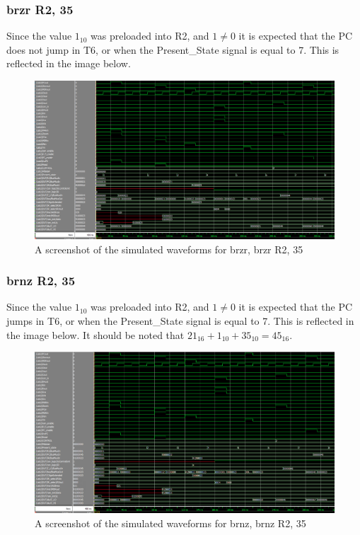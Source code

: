\documentclass{article}
\begin{document}
        \subsubsection{brzr R2, 35}
            Since the value $1_{10}$ was preloaded into R2, and $1 \neq 0$ it is expected that the PC does not jump in T6, or when the Present\_State signal is equal to 7. This is reflected in the image below.

                \begin{figure}[h!]
                    \begin{center}
                        \includegraphics[width=15cm]{brzr_wave.png}
                        \caption{A screenshot of the simulated waveforms for brzr, brzr R2, 35}
                    \end{center}
                \end{figure}

        \subsubsection{brnz R2, 35}
            Since the value $1_{10}$ was preloaded into R2, and $1 \neq 0$ it is expected that the PC jumps in T6, or when the Present\_State signal is equal to 7. This is reflected in the image below. It should be noted that $21_{16} + 1_{10} + 35_{10} = 45_{16}$. 

                \begin{figure}[h!]
                    \begin{center}
                        \includegraphics[width=15cm]{brnz_wave.png}
                        \caption{A screenshot of the simulated waveforms for brnz, brnz R2, 35}
                    \end{center}
                \end{figure}
\end{document}

